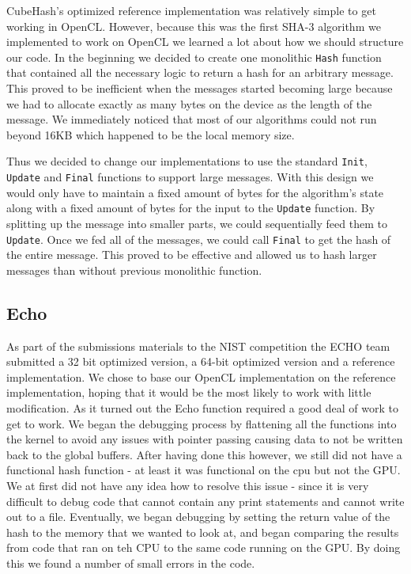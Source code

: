 CubeHash's optimized reference implementation was relatively simple to get working in OpenCL.
However, because this was the first SHA-3 algorithm we implemented to work on OpenCL we learned a lot about how we should structure our code.
In the beginning we decided to create one monolithic {\tt Hash} function that contained all the necessary logic to return a hash for an arbitrary message.
This proved to be inefficient when the messages started becoming large because we had to allocate exactly as many bytes on the device as the length of the message.
We immediately noticed that most of our algorithms could not run beyond 16KB which happened to be the local memory size.

Thus we decided to change our implementations to use the standard {\tt Init}, {\tt Update} and {\tt Final} functions to support large messages.
With this design we would only have to maintain a fixed amount of bytes for the algorithm's state along with a fixed amount of bytes for the input to the {\tt Update} function.
By splitting up the message into smaller parts, we could sequentially feed them to {\tt Update}.
Once we fed all of the messages, we could call {\tt Final} to get the hash of the entire message.
This proved to be effective and allowed us to hash larger messages than without previous monolithic function.

\subsection*{Echo}

As part of the submissions materials to the NIST competition the ECHO team submitted a 32 bit optimized version, a 64-bit optimized version and a reference implementation.  
We chose to base our OpenCL implementation on the reference implementation, hoping that it would be the most likely to work with little modification.
As it turned out the Echo function required a good deal of work to get to work.
We began the debugging process by flattening all the functions into the kernel to avoid any issues with pointer passing causing data to not be written back to the global buffers.
After having done this however, we still did not have a functional hash function - at least it was functional on the cpu but not the GPU.  
We at first did not have any idea how to resolve this issue - since it is very difficult to debug code that cannot contain any print statements and cannot write out to a file. 
Eventually, we began debugging by setting the return value of the hash to the memory that we wanted to look at, and began comparing the results from code that ran on teh CPU to the same code running on the GPU.
By doing this we found a number of small errors in the code.

